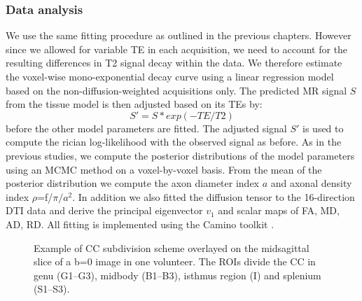 \subsubsection*{Data analysis}
We use the same fitting procedure as outlined in the previous chapters. However since we allowed for variable TE in each acquisition, we need to account for the resulting differences in T2 signal decay within the data. We therefore estimate the voxel-wise mono-exponential decay curve using a linear regression model based on the non-diffusion-weighted acquisitions only. The predicted MR signal $S$ from the tissue model is then adjusted based on its \glspl{TE} by:
\begin{equation}
	S' = S * exp(-TE/T2)
\end{equation}
before the other model parameters are fitted. The adjusted signal $S'$ is used to compute the rician log-likelihood with the observed signal as before. As in the previous studies, we compute the posterior distributions of the model parameters using an MCMC method on a voxel-by-voxel basis. From the mean of the posterior distribution we compute the axon diameter index $a$ and axonal density index $\rho$=f/$\pi/a^2$. In addition we also fitted the diffusion tensor to the 16-direction DTI data and derive the principal eigenvector $v_1$ and scalar maps of FA, MD, AD, RD. All fitting is implemented using the Camino toolkit \citep{Cook:2006}.
\begin{figure}[ht]
	\centering
	\caption{Example of CC subdivision scheme overlayed on the midsagittal slice of a b=0 image in one volunteer. The ROIs divide the CC in genu (G1--G3), midbody (B1--B3), isthmus region (I) and splenium (S1--S3).}
	\label{fig:chap9 CC ROIs}
\end{figure}
